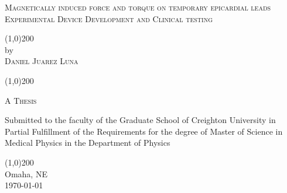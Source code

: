 

	\begin{center}
		{\LARGE \scshape{Magnetically induced force and torque on temporary epicardial leads \\\large Experimental Device Development and Clinical testing}} %
		
		
		\vspace{4cm}
		\line(1,0){200} \\
		\vspace*{0.5cm}
		by \\	
		\vspace*{0.5cm}
		\large \scshape{
		Daniel Juarez Luna}
		\vspace*{0.5cm}
		
		\line(1,0){200}
		
		\vspace{3cm}
		\textsc{
		A Thesis }

		
		\vspace{2cm}
	\textnormal{	Submitted to the faculty of the Graduate School of Creighton University in Partial
Fulfillment of the Requirements for the degree of Master of Science in Medical Physics in the Department of Physics}
		
		\vspace{1cm}
		\line(1,0){200} \\	
		\vspace*{1cm}	\textnormal{
		Omaha, NE\\
		\today}
	\thispagestyle{empty}
	\end{center}
